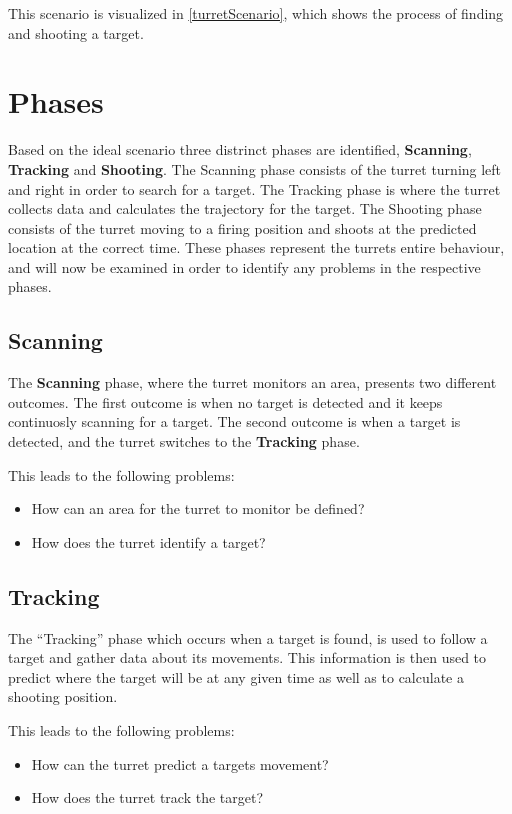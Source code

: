 This scenario is visualized in \autoref{turretScenario}, which shows the process
of finding and shooting a target.


\section{Phases}
Based on the ideal scenario three distrinct phases are identified,
\textbf{Scanning}, \textbf{Tracking} and \textbf{Shooting}. The Scanning phase
consists of the turret turning left and right in order to search for a target.
The Tracking phase is where the turret collects data and calculates the
trajectory for the target. The Shooting phase consists of the turret moving to
a firing position and shoots at the predicted location at the correct time.
These phases represent the turrets entire behaviour, and will now be examined in
order to identify any problems in the respective phases.

\subsection{Scanning}
The \textbf{Scanning} phase, where the turret monitors an area, presents two
different outcomes. The first outcome is when no target is detected and it
keeps continuosly scanning for a target. The second outcome is when a target
is detected, and the turret switches to the \textbf{Tracking} phase.\nl

This leads to the following problems:
\begin{itemize}
  \item How can an area for the turret to monitor be defined?
  \item How does the turret identify a target?
\end{itemize}

\subsection{Tracking}
The ``Tracking'' phase which occurs when a target is found, is used to follow a
target and gather data about its movements. This information is then used to
predict where the target will be at any given time as well as to calculate a
shooting position.\nl

This leads to the following problems:
\begin{itemize}
  \item How can the turret predict a targets movement?
  \item How does the turret track the target?
\end{itemize}

